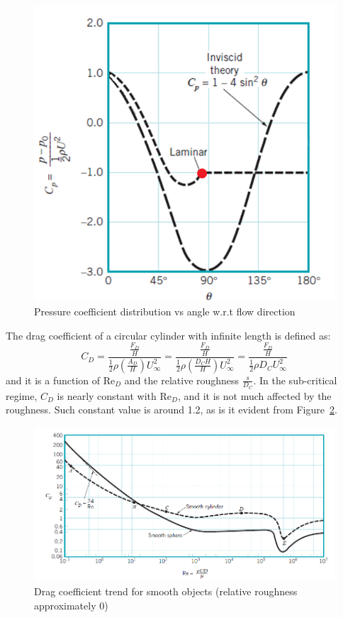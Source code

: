 \documentclass[12pt]{article}
\begin{document}
        \begin{figure}[!ht]
                \includegraphics[width=\textwidth]{Pressure_Distribution.png}
                \centering
                \caption{Pressure coefficient distribution vs angle w.r.t flow direction}
                \label{fig:p_d}
        \end{figure}

        The drag coefficient of a circular cylinder with infinite length is defined as: $$C_D = \frac{\frac{F_D}{H}}{\frac{1}{2} \rho \left(\frac{A_D}{H}\right) U_\infty^2} = \frac{\frac{F_D}{H}}{\frac{1}{2} \rho \left(\frac{D_C H}{H}\right) U_\infty^2} = \frac{\frac{F_D}{H}}{\frac{1}{2} \rho D_C U_\infty^2}$$ and it is a function of $\text{Re}_D$ and the relative roughness $\frac{s}{D_C}$. In the sub-critical regime, $C_D$ is nearly constant with $\text{Re}_D$, and it is not much affected by the roughness. Such constant value is around 1.2, as is it evident from Figure~\ref{fig:dragtrend}.

        \begin{figure}[!ht]
                \includegraphics[width=\textwidth]{DragCoefficient_Trend.png}
                \centering
                \caption{Drag coefficient trend for smooth objects (relative roughness approximately 0)}
                \label{fig:dragtrend}
        \end{figure}
\end{document}
